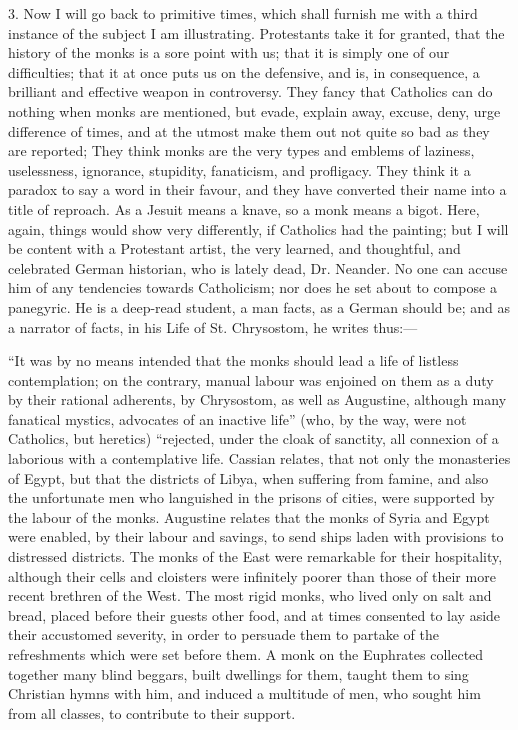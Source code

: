 3. Now I will go back to primitive times, which shall
furnish me with a third instance of the subject I am
illustrating. Protestants take it for granted, that the
history of the monks is a sore point with us; that it is
simply one of our difficulties; that it at once puts us
on the defensive, and is, in consequence, a brilliant and
effective weapon in controversy. They fancy that
Catholics can do nothing when monks are mentioned, but
evade, explain away, excuse, deny, urge difference of
times, and at the utmost make them out not quite so bad
as they are reported; They think monks are the very types
and emblems of laziness, uselessness, ignorance,
stupidity, fanaticism, and profligacy. They think it a
paradox to say a word in their favour, and they have
converted their name into a title of reproach. As a
Jesuit means a knave, so a monk means a bigot. Here,
again, things would show very differently, if Catholics
had the painting; but I will be content with a Protestant
artist, the very learned, and thoughtful, and celebrated
German historian, who is lately dead, Dr. Neander. No one
can accuse him of any tendencies towards Catholicism; nor
does he set about to compose a panegyric. He is a
deep-read student, a man facts, as a German should be;
and as a narrator of facts, in his Life of St.
Chrysostom, he writes thus:—

``It was by no means intended that the monks
should lead a life of listless contemplation; on the
contrary, manual labour was enjoined on them as a duty by
their rational adherents, by Chrysostom, as well as
Augustine, although many fanatical mystics, advocates of
an inactive life'' (who, by the way, were not Catholics,
but heretics) ``rejected, under the cloak of
sanctity, all connexion of a laborious with a
contemplative life. Cassian relates, that not only the
monasteries of Egypt, but that the districts of Libya,
when suffering from famine, and also the unfortunate men
who languished in the prisons of cities, were supported
by the labour of the monks. Augustine relates that the
monks of Syria and Egypt were enabled, by their labour
and savings, to send ships laden with provisions to
distressed districts. The monks of the East were
remarkable for their hospitality, although their cells
and cloisters were infinitely poorer than those of their
more recent brethren of the West. The most rigid monks,
who lived only on salt and bread, placed before their
guests other food, and at times consented to lay aside
their accustomed severity, in order to persuade them to
partake of the refreshments which were set before them. A
monk on the Euphrates collected together many blind
beggars, built dwellings for them, taught them to sing
Christian hymns with him, and induced a multitude of men,
who sought him from all classes, to contribute to their
support.

